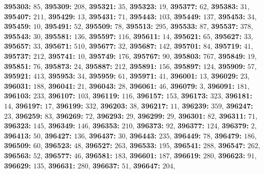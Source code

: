 \textsf{\bfseries 395303:} $85$, \textsf{\bfseries 395309:} $208$, \textsf{\bfseries 395321:} $35$, \textsf{\bfseries 395323:} $19$, \textsf{\bfseries 395377:} $62$, \textsf{\bfseries 395383:} $31$, \textsf{\bfseries 395407:} $211$, \textsf{\bfseries 395429:} $13$, \textsf{\bfseries 395431:} $71$, \textsf{\bfseries 395443:} $103$, \textsf{\bfseries 395449:} $137$, \textsf{\bfseries 395453:} $34$, \textsf{\bfseries 395459:} $10$, \textsf{\bfseries 395491:} $52$, \textsf{\bfseries 395509:} $78$, \textsf{\bfseries 395513:} $295$, \textsf{\bfseries 395533:} $87$, \textsf{\bfseries 395537:} $378$, \textsf{\bfseries 395543:} $30$, \textsf{\bfseries 395581:} $136$, \textsf{\bfseries 395597:} $116$, \textsf{\bfseries 395611:} $14$, \textsf{\bfseries 395621:} $65$, \textsf{\bfseries 395627:} $33$, \textsf{\bfseries 395657:} $33$, \textsf{\bfseries 395671:} $510$, \textsf{\bfseries 395677:} $32$, \textsf{\bfseries 395687:} $142$, \textsf{\bfseries 395701:} $84$, \textsf{\bfseries 395719:} $41$, \textsf{\bfseries 395737:} $212$, \textsf{\bfseries 395741:} $10$, \textsf{\bfseries 395749:} $176$, \textsf{\bfseries 395767:} $90$, \textsf{\bfseries 395803:} $767$, \textsf{\bfseries 395849:} $19$, \textsf{\bfseries 395851:} $76$, \textsf{\bfseries 395873:} $24$, \textsf{\bfseries 395887:} $212$, \textsf{\bfseries 395891:} $156$, \textsf{\bfseries 395897:} $124$, \textsf{\bfseries 395909:} $57$, \textsf{\bfseries 395921:} $413$, \textsf{\bfseries 395953:} $34$, \textsf{\bfseries 395959:} $61$, \textsf{\bfseries 395971:} $41$, \textsf{\bfseries 396001:} $13$, \textsf{\bfseries 396029:} $23$, \textsf{\bfseries 396031:} $188$, \textsf{\bfseries 396041:} $21$, \textsf{\bfseries 396043:} $28$, \textsf{\bfseries 396061:} $46$, \textsf{\bfseries 396079:} $3$, \textsf{\bfseries 396091:} $181$, \textsf{\bfseries 396103:} $233$, \textsf{\bfseries 396107:} $103$, \textsf{\bfseries 396119:} $116$, \textsf{\bfseries 396157:} $153$, \textsf{\bfseries 396173:} $323$, \textsf{\bfseries 396181:} $14$, \textsf{\bfseries 396197:} $17$, \textsf{\bfseries 396199:} $332$, \textsf{\bfseries 396203:} $38$, \textsf{\bfseries 396217:} $11$, \textsf{\bfseries 396239:} $359$, \textsf{\bfseries 396247:} $23$, \textsf{\bfseries 396259:} $83$, \textsf{\bfseries 396269:} $72$, \textsf{\bfseries 396293:} $29$, \textsf{\bfseries 396299:} $29$, \textsf{\bfseries 396301:} $82$, \textsf{\bfseries 396311:} $71$, \textsf{\bfseries 396323:} $145$, \textsf{\bfseries 396349:} $146$, \textsf{\bfseries 396353:} $210$, \textsf{\bfseries 396373:} $92$, \textsf{\bfseries 396377:} $124$, \textsf{\bfseries 396379:} $2$, \textsf{\bfseries 396413:} $50$, \textsf{\bfseries 396427:} $136$, \textsf{\bfseries 396437:} $30$, \textsf{\bfseries 396443:} $235$, \textsf{\bfseries 396449:} $78$, \textsf{\bfseries 396479:} $186$, \textsf{\bfseries 396509:} $60$, \textsf{\bfseries 396523:} $48$, \textsf{\bfseries 396527:} $263$, \textsf{\bfseries 396533:} $195$, \textsf{\bfseries 396541:} $288$, \textsf{\bfseries 396547:} $262$, \textsf{\bfseries 396563:} $52$, \textsf{\bfseries 396577:} $46$, \textsf{\bfseries 396581:} $183$, \textsf{\bfseries 396601:} $187$, \textsf{\bfseries 396619:} $280$, \textsf{\bfseries 396623:} $91$, \textsf{\bfseries 396629:} $135$, \textsf{\bfseries 396631:} $280$, \textsf{\bfseries 396637:} $51$, \textsf{\bfseries 396647:} $204$, 

